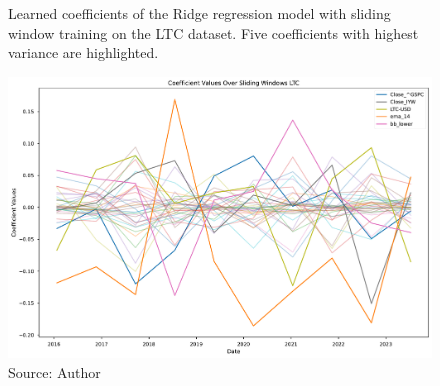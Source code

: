 \begin{figure}[!h]
    \centering
    \caption{Learned coefficients of the Ridge regression model
    with sliding window training on the LTC dataset. Five 
    coefficients with highest variance are highlighted.}
    \includegraphics[width=1\textwidth]{Figures/coefficient_values_sliding_ltc.pdf}
    \caption*{Source: Author}
    \label{fig:coefs_sliding_ltc}
\end{figure}



